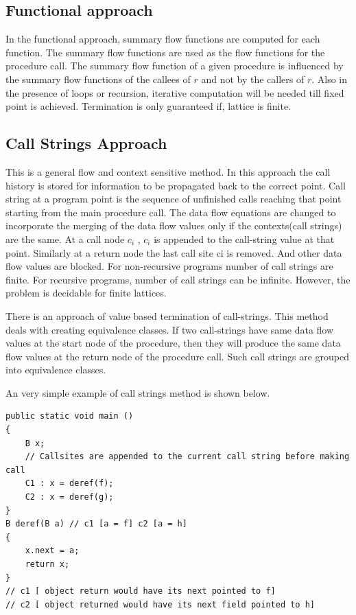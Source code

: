 \subsection{Functional approach}

In the functional approach, summary flow functions are computed for each function. The summary flow functions are used as the flow functions for the procedure call. The summary flow function of a given procedure is influenced by the summary flow functions of the callees of $r$ and not by the callers of $r$. Also in the presence of loops or recursion, iterative computation will be needed till fixed point is achieved. Termination is only guaranteed if, lattice is finite.

\subsection{Call Strings Approach}

This is a general flow and context sensitive method. In this approach the call history is stored for information to be propagated back to the correct point. Call string at a program point is the sequence of unfinished calls reaching that point starting from the main procedure call. The data flow equations are changed to incorporate the merging of the data flow values only if the contexts(call strings) are the same. At a call node $c_i$ , $c_i$ is appended to the call-string value at that point. Similarly at a return node the last call site ci is removed. And other data flow values are blocked. For non-recursive programs number of call strings are finite. For recursive programs, number of call strings can be infinite. However, the problem is decidable for finite lattices.

There is an approach of value based termination of call-strings. This method deals with creating equivalence classes. If two call-strings have same data flow values at the start node of the procedure, then they will produce the same data flow values at the return node of the procedure call. Such call strings are grouped into equivalence classes.

An very simple example of call strings method is shown below.\cite{mtpreport}
\begin{verbatim}
public static void main ()
{
	B x;
	// Callsites are appended to the current call string before making call
	C1 : x = deref(f); 
	C2 : x = deref(g);
}
B deref(B a) // c1 [a = f] c2 [a = h]
{
	x.next = a;
	return x;
}
// c1 [ object return would have its next pointed to f] 
// c2 [ object returned would have its next field pointed to h]

\end{verbatim}


